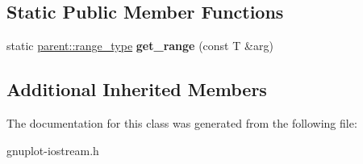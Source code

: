 \subsection*{Static Public Member Functions}
\begin{DoxyCompactItemize}
\item 
\mbox{\label{classgnuplotio_1_1ArrayTraits_3_01T_00_01typename_01boost_1_1enable__if_3_01boost_1_1mpl_1_1and_371638f7d82cde4b7a8a064d0797371a_aec07e01edbb46f5f283d5b6af068c0f2}} 
static \hyperlink{structgnuplotio_1_1Error__WasNotContainer}{parent\+::range\+\_\+type} {\bfseries get\+\_\+range} (const T \&arg)
\end{DoxyCompactItemize}
\subsection*{Additional Inherited Members}


The documentation for this class was generated from the following file\+:\begin{DoxyCompactItemize}
\item 
gnuplot-\/iostream.\+h\end{DoxyCompactItemize}

